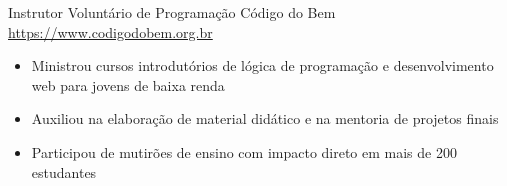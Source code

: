 \documentclass[a4paper, serif, 10pt]{moderncv}
\begin{document}
        {Instrutor Voluntário de Programação}
        {Código do Bem}
        {\url{https://www.codigodobem.org.br}}
        {}
        {\begin{itemize}
\item Ministrou cursos introdutórios de lógica de programação e desenvolvimento web para jovens de baixa renda
\item Auxiliou na elaboração de material didático e na mentoria de projetos finais
\item Participou de mutirões de ensino com impacto direto em mais de 200 estudantes
\end{itemize}}
    
\end{document}
